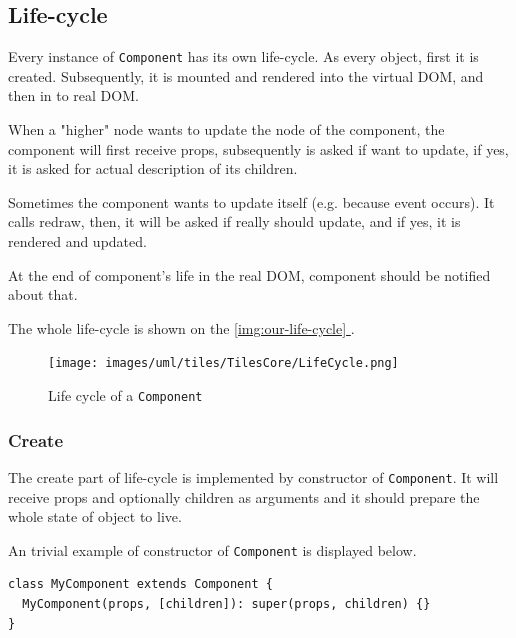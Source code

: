 \documentclass[oneside, 12pt]{book}
\newcommand*{\fullref}[1]{\hyperref[{#1}]{\autoref*{#1} \nameref*{#1}}}
\begin{document}
  \subsection{Life-cycle}\label{subsec:our-architecture-lifecycle}

    Every instance of \texttt{Component} has its own life-cycle. 
    As every object, first it is created. 
    Subsequently, it is mounted and rendered into the virtual DOM, and then in to real DOM.

    When a "higher" node wants to update the node of the component, 
    the component will first receive props, 
    subsequently is asked if want to update, 
    if yes, it is asked for actual description of its children. 

    Sometimes the component wants to update itself (e.g. because event occurs).
    It calls redraw, then, it will be asked if really should update, and if yes, it is rendered and updated.

    At the end of component's life in the real DOM, 
    component should be notified about that.

    The whole life-cycle is shown on the \fullref{img:our-life-cycle}.

    \begin{figure}[h]
    \centering  
      \texttt{[image: images/uml/tiles/TilesCore/LifeCycle.png]}
      \caption{Life cycle of a \texttt{Component}}
      \label{img:our-life-cycle}
    \end{figure}

    \subsubsection{Create}\label{subsec:our-architecture-lifecycle-create}

      The create part of life-cycle is implemented by constructor of \texttt{Component}. 
      It will receive props and optionally children as arguments and 
      it should prepare the whole state of object to live.

      An trivial example of constructor of \texttt{Component} is displayed below.
      \begin{verbatim}
class MyComponent extends Component {
  MyComponent(props, [children]): super(props, children) {}
}
      \end{verbatim}

\end{document}
